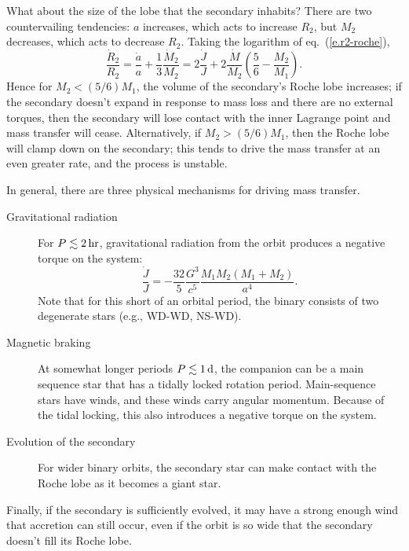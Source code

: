 What about the size of the lobe that the secondary inhabits?  There are two countervailing tendencies: $a$ increases, which acts to increase $R_{2}$, but $M_{2}$ decreases, which acts to decrease $R_{2}$.  Taking the logarithm of eq.~(\ref{e.r2-roche}),
\begin{equation}\label{e.r2dot}
\frac{\dot{R}_{2}}{R_{2}} = \frac{\dot{a}}{a} + \frac{1}{3}\frac{\dot{M}_{2}}{M_{2}} = 2\frac{\dot{J}}{J} + 2\frac{\dot{M}}{M_{2}} \left(\frac{5}{6} - \frac{M_{2}}{M_{1}}\right).
\end{equation}
Hence for $M_{2} < (5/6) M_{1}$, the volume of the secondary's Roche lobe increases; if the secondary doesn't expand in response to mass loss and there are no external torques, then the secondary will lose contact with the inner Lagrange point and mass transfer will cease.  Alternatively, if $M_{2} > (5/6) M_{1}$, then the Roche lobe will clamp down on the secondary; this tends to drive the mass transfer at an even greater rate, and the process is unstable.

In general, there are three physical mechanisms for driving mass transfer.
\begin{description}
\item[Gravitational radiation] For $P \lesssim 2\,\mathrm{hr}$, gravitational radiation from the orbit produces a negative torque on the system:
\begin{equation}\label{e.GR-torque}
\frac{\dot{J}}{J} = -\frac{32}{5}\frac{G^{3}}{c^{5}}\frac{M_{1}M_{2}(M_{1}+M_{2})}{a^{4}}.
\end{equation}
Note that for this short of an orbital period, the binary consists of two degenerate stars (e.g., WD-WD, NS-WD).
\item[Magnetic braking] At somewhat longer periods $P \lesssim 1\,\mathrm{d}$, the companion can be a main sequence star that has a tidally locked rotation period.  Main-sequence stars have winds, and these winds carry angular momentum.  Because of the tidal locking, this also introduces a negative torque on the system.
\item[Evolution of the secondary] For wider binary orbits, the secondary star can make contact with the Roche lobe as it becomes a giant star.
\end{description}
Finally, if the secondary is sufficiently evolved, it may have a strong enough wind that accretion can still occur, even if the orbit is so wide that the secondary doesn't fill its Roche lobe.


